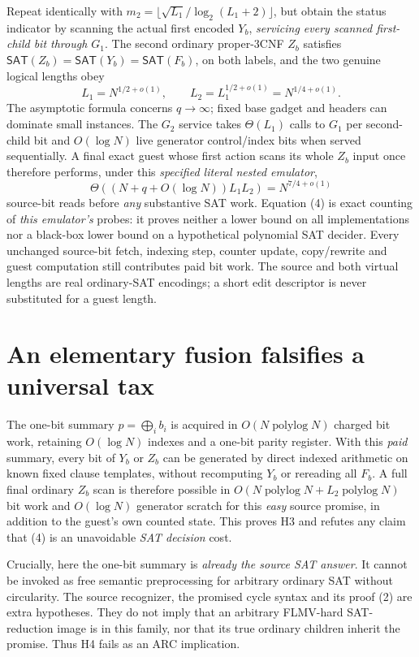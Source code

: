 \documentclass[11pt]{article}
\newcommand{\SAT}{\mathsf{SAT}}
\begin{document}
Repeat identically with \(m_2=\lfloor\sqrt{L_1}/\log_2(L_1+2)\rfloor\),
but obtain the status indicator by scanning the actual first encoded
\(Y_b\), \emph{servicing every scanned first-child bit through \(G_1\)}.
The second ordinary proper-3CNF \(Z_b\) satisfies
\(\SAT(Z_b)=\SAT(Y_b)=\SAT(F_b)\), on both labels,
and the two genuine logical lengths obey
\[
L_1=N^{1/2+o(1)},\qquad
L_2=L_1^{1/2+o(1)}=N^{1/4+o(1)}.
\tag{3}
\]
The asymptotic formula concerns \(q\to\infty\); fixed base gadget and
headers can dominate small instances. The \(G_2\) service takes
\(\Theta(L_1)\) calls to \(G_1\) per second-child bit and
\(O(\log N)\) live generator control/index bits when served sequentially.
A final exact guest whose first action scans its whole \(Z_b\) input
once therefore performs, under this \emph{specified literal nested
emulator},
\[
\boxed{\Theta((N+q+O(\log N))L_1L_2)
        =N^{7/4+o(1)}}
\tag{4}
\]
source-bit reads before \emph{any} substantive SAT work.
Equation (4) is exact counting of \emph{this emulator's} probes:
it proves neither a lower bound on all implementations nor a
black-box lower bound on a hypothetical polynomial SAT decider.
Every unchanged source-bit fetch, indexing step, counter update,
copy/rewrite and guest computation still contributes paid bit work.
The source and both virtual lengths are real ordinary-SAT
encodings; a short edit descriptor is never substituted for a guest length.

\section{An elementary fusion falsifies a universal tax}
The one-bit summary
\(p=\bigoplus_i b_i\) is acquired in \(O(N\operatorname{polylog}N)\)
charged bit work, retaining \(O(\log N)\) indexes and a one-bit parity
register. With this \emph{paid} summary, every bit of \(Y_b\) or \(Z_b\)
can be generated by direct indexed arithmetic on known fixed clause
templates, without recomputing \(Y_b\) or rereading all \(F_b\).
A full final ordinary \(Z_b\) scan is therefore possible in
\(O(N\operatorname{polylog}N+L_2\operatorname{polylog}N)\)
bit work and \(O(\log N)\) generator scratch for this \emph{easy}
source promise, in addition to the guest's own counted state.
This proves H3 and refutes any claim that (4) is an unavoidable
\emph{SAT decision} cost.

Crucially, here the one-bit summary is \emph{already the source SAT
answer}. It cannot be invoked as free semantic preprocessing for
arbitrary ordinary SAT without circularity. The source recognizer,
the promised cycle syntax and its proof (2) are extra hypotheses.
They do not imply that an arbitrary FLMV-hard SAT-reduction image
is in this family, nor that its true ordinary children inherit
the promise. Thus H4 fails as an ARC implication.
\end{document}
